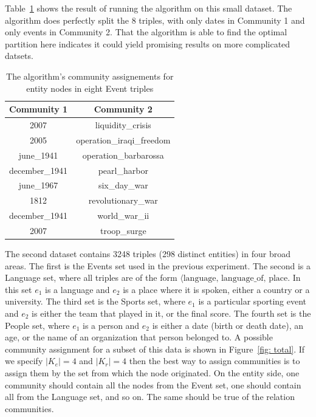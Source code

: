 \documentclass[12pt]{article}
\begin{document}
Table~\ref{tab: events} shows the result of running the algorithm on this small
dataset. The algorithm does perfectly split the 8 triples, with only dates in
Community 1 and only events in Community 2. That the algorithm is able to find
the optimal partition here indicates it could yield promising results on more
complicated datsets.

\begin{table}[b]
    \begin{tabular}{|c|c|}
        \hline
        Community 1 & Community 2 \\ \hline
        2007 & liquidity\_crisis \\
        2005 & operation\_iraqi\_freedom \\
        june\_1941 & operation\_barbarossa \\
        december\_1941 & pearl\_harbor \\
        june\_1967 & six\_day\_war \\
        1812 & revolutionary\_war \\
        december\_1941 & world\_war\_ii \\
        2007 & troop\_surge \\
        \hline
    \end{tabular}
    \caption{The algorithm's community assignements for entity nodes in eight Event triples}
    \label{tab: events}
\end{table}

The second dataset contains 3248 triples (298 distinct entities) in four broad
areas. The first is the Events set used in the previous experiment. The second
is a Language set, where all triples are of the form $\langle \text{language},
\,\text{language\_of}, \,\text{place}$. In this set $e_1$ is a language and
$e_2$ is a place where it is spoken, either a country or a university. The third
set is the Sports set, where $e_1$ is a particular sporting event and $e_2$ is
either the team that played in it, or the final score. The fourth set is the
People set, where $e_1$ is a person and $e_2$ is either a date (birth or death
date), an age, or the name of an organization that person belonged to. A
possible community assignment for a subset of this data is shown in
Figure~\ref{fig: total}. If we specify $|K_e| = 4$ and $|K_r|=4$ then the best
way to assign communities is to assign them by the set from which the node
originated. On the entity side, one community should contain all the nodes from
the Event set, one should contain all from the Language set, and so on. The same
should be true of the relation communities.
\end{document}
